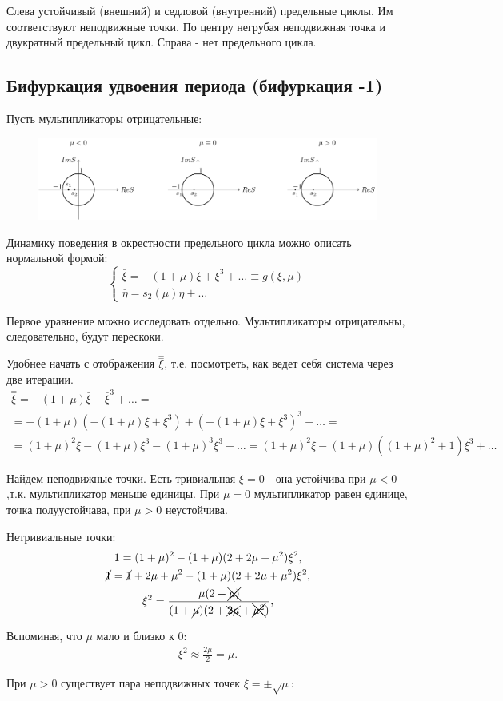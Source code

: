 Слева устойчивый (внешний) и седловой (внутренний) предельные циклы. Им соответствуют неподвижные точки. По центру негрубая неподвижная точка и двукратный предельный цикл. Справа - нет предельного цикла.

\subsection{Бифуркация удвоения периода (бифуркация -1)}
Пусть мультипликаторы отрицательные:
\begin{figure}[H]
	\centering
	\includegraphics[width=1\linewidth]{fig/fig67.pdf}   
\end{figure}

Динамику поведения в окрестности предельного цикла можно описать нормальной формой:
\begin{equation}
	\begin{cases}
		\stackrel{\_}{\xi}= -(1+\mu)\xi+\xi^3+\dots \equiv g(\xi,\mu)\\
		\stackrel{\_}{\eta}= s_2(\mu)\eta+\dots
	\end{cases}
	\label{eq:110}	
\end{equation}

Первое уравнение можно исследовать отдельно. Мультипликаторы отрицательны, следовательно, будут перескоки. 

Удобнее начать с отображения $\stackrel{=}{\xi}$, т.е. посмотреть, как ведет себя система через две итерации.
\begin{gather*}
	\stackrel{=}{\xi}=-(1+\mu)\stackrel{\_}{\xi}+\stackrel{\_}{\xi}^3+\dots= \\
	=-(1+\mu)(-(1+\mu)\xi+\xi^3)+(-(1+\mu)\xi+\xi^3)^3+\dots= \\
	=(1+\mu)^2\xi-(1+\mu)\xi^3-(1+\mu)^3\xi^3+\dots=(1+\mu)^2\xi-(1+\mu)((1+\mu)^2+1)\xi^3+\dots
\end{gather*}

Найдем неподвижные точки. Есть тривиальная $\xi=0$ - она устойчива при $\mu<0$,т.к. мультипликатор меньше единицы. При $\mu=0$ мультипликатор равен единице, точка полуустойчава, при $\mu>0$ неустойчива.

Нетривиальные точки:
\begin{gather*}
	1=(1+\mu)^2-(1+\mu)(2+2\mu+\mu^2)\xi^2, \\
	\cancel{1}=\cancel{1} +2\mu+\mu^2-(1+\mu)(2+2\mu+\mu^2)\xi^2, \\
	\xi^2=\frac{\mu(2+\xcancel{\mu)}}{(1+\cancel{\mu})(2+\xcancel{2\mu}+\xcancel{\mu^2})},
\end{gather*}

Вспоминая, что $\mu$ мало и близко к 0:
\begin{gather*}
	\xi^2 \approx \frac{2\mu}{2}=\mu.
\end{gather*}

При $\mu>0$ существует пара неподвижных точек $\xi=\pm \sqrt{\mu}$:

{}